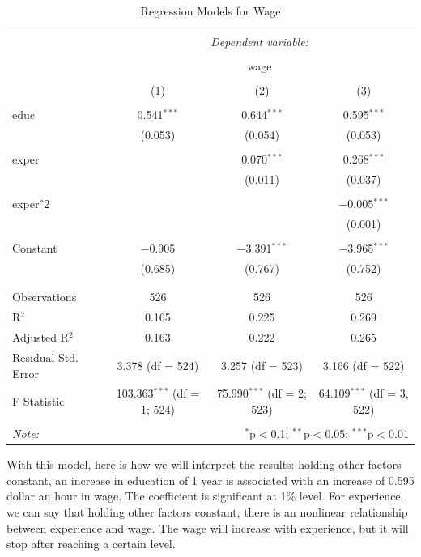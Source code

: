 \documentclass[11pt]{article}
\theoremstyle{definition}
\begin{document}
\begin{table}[!htbp] \centering 
  \caption{Regression Models for Wage} 
  \label{} 
\begin{tabular}{@{\extracolsep{5pt}}lccc} 
\\[-1.8ex]\hline 
\hline \\[-1.8ex] 
 & \multicolumn{3}{c}{\textit{Dependent variable:}} \\ 
\cline{2-4} 
\\[-1.8ex] & \multicolumn{3}{c}{wage} \\ 
\\[-1.8ex] & (1) & (2) & (3)\\ 
\hline \\[-1.8ex] 
 educ & 0.541$^{***}$ & 0.644$^{***}$ & 0.595$^{***}$ \\ 
  & (0.053) & (0.054) & (0.053) \\ 
  & & & \\ 
 exper &  & 0.070$^{***}$ & 0.268$^{***}$ \\ 
  &  & (0.011) & (0.037) \\ 
  & & & \\ 
 exper$\hat{\mkern6mu}$2 &  &  & $-$0.005$^{***}$ \\ 
  &  &  & (0.001) \\ 
  & & & \\ 
 Constant & $-$0.905 & $-$3.391$^{***}$ & $-$3.965$^{***}$ \\ 
  & (0.685) & (0.767) & (0.752) \\ 
  & & & \\ 
\hline \\[-1.8ex] 
Observations & 526 & 526 & 526 \\ 
R$^{2}$ & 0.165 & 0.225 & 0.269 \\ 
Adjusted R$^{2}$ & 0.163 & 0.222 & 0.265 \\ 
Residual Std. Error & 3.378 (df = 524) & 3.257 (df = 523) & 3.166 (df = 522) \\ 
F Statistic & 103.363$^{***}$ (df = 1; 524) & 75.990$^{***}$ (df = 2; 523) & 64.109$^{***}$ (df = 3; 522) \\ 
\hline 
\hline \\[-1.8ex] 
\textit{Note:}  & \multicolumn{3}{r}{$^{*}$p$<$0.1; $^{**}$p$<$0.05; $^{***}$p$<$0.01} \\ 
\end{tabular} 
\end{table} 


With this model, here is how we will interpret the results: holding other factors
constant, an increase in education of 1 year is associated with an 
increase of 0.595 dollar an hour in wage. The coefficient is significant 
at 1\% level. For experience, we can say that holding other factors constant, 
there is an nonlinear relationship between experience and wage. 
The wage will increase with experience, but it will stop after reaching a certain level.
\end{document}
